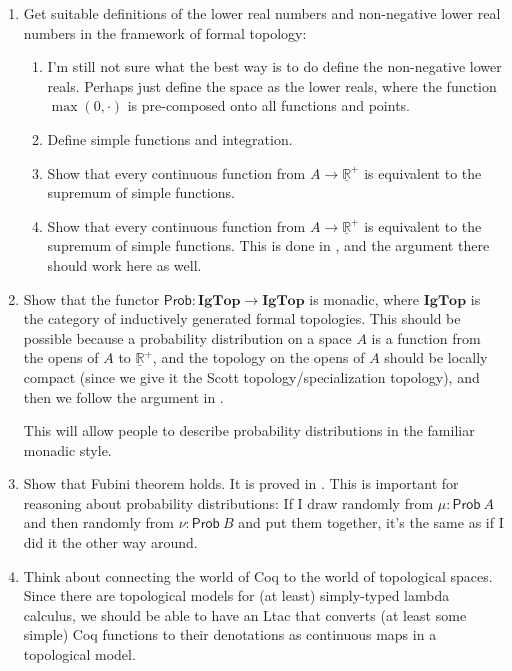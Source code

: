 \begin{enumerate}
\item Get suitable definitions of the lower real numbers and non-negative lower real numbers in the framework of formal topology:
\begin{enumerate}
  \item I'm still not sure what the best way is to do define the non-negative lower reals. Perhaps just define the space as the lower reals, where the function $\max(0, \cdot)$ is pre-composed onto all functions and points.
  \item Define simple functions and integration.
  \item Show that every continuous function from $A \to \underline{\mathbb{R}}^+$ is equivalent to the supremum of simple functions.
  \item Show that every continuous function from $A \to \underline{\mathbb{R}}^+$ is equivalent to the supremum of simple functions. This is done in \cite{jones1990}, and the argument there should work here as well.
\end{enumerate}

\item Show that the functor $\mathsf{Prob} : \mathbf{IgTop} \to \mathbf{IgTop}$ is monadic, where $\mathbf{IgTop}$ is the category of inductively generated formal topologies. This should be possible because a probability distribution on a space $A$ is a function from the opens of $A$ to $\underline{\mathbb{R}}^+$, and the topology on the opens of $A$ should be locally compact (since we give it the Scott topology/specialization topology), and then we follow the argument in \cite{maietti2005}.

This will allow people to describe probability distributions in the familiar monadic style.

\item Show that Fubini theorem holds. It is proved in \cite{vickers2011}. This is important for reasoning about probability distributions: If I draw randomly from $\mu : \mathsf{Prob}\ A$ and then randomly from $\nu : \mathsf{Prob}\ B$ and put them together, it's the same as if I did it the other way around.

\item Think about connecting the world of Coq to the world of topological spaces. Since there are topological models for (at least) simply-typed lambda calculus, we should be able to have an Ltac that converts (at least some simple) Coq functions to their denotations as continuous maps in a topological model. 


\end{enumerate}
